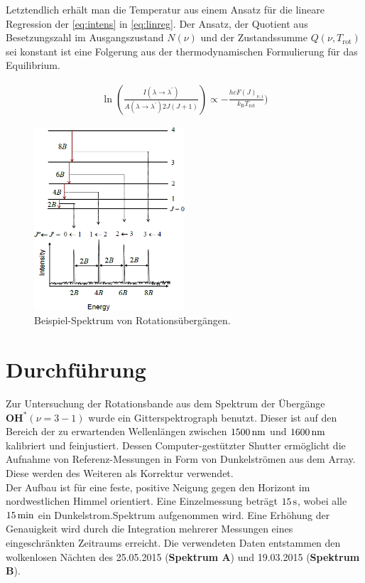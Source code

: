 \documentclass[numbers=noenddot,a4paper,notitlepage,twoside,BCOR15mm]{scrartcl}
\newcommand{\ix}[1]{_\text{#1}}
\newcommand{\fett}[1]{\textbf{#1}}
\begin{document}
		Letztendlich erhält man die Temperatur aus einem Ansatz für die lineare Regression der \autoref{eq:intens} in \autoref{eq:linreg}. Der Ansatz, der Quotient aus Besetzungszahl im Ausgangszustand $N(\nu)$ und der Zustandssumme $Q(\nu,T\ix{rot})$ sei konstant ist eine Folgerung aus der thermodynamischen Formulierung für das Equilibrium.

			\begin{align}
				\ln\left(\frac{I(\lambda\rightarrow\lambda^\prime)}{A(\lambda\rightarrow\lambda^\prime)2J(J+1)}\right)\propto-\frac{hcF(J)_{\nu,i}}{k\ix{B}T\ix{rot}}) \label{eq:linreg}
			\end{align}

			\begin{figure}[h]
				\centering
				\includegraphics[width=0.5\textwidth]{Rotational_spectrum_example.png}
				\caption{Beispiel-Spektrum von Rotationsübergängen. \cite{WikiRotat}}
				\label{img:bspspektr}
			\end{figure}

	\newpage
	\section{Durchführung}

		Zur Untersuchung der Rotationsbande aus dem Spektrum der Übergänge $\fett{OH}^\ast(\nu=3-1)$ wurde ein Gitterspektrograph benutzt. Dieser ist auf den Bereich der zu erwartenden Wellenlängen zwischen $\unit[1500]{nm}$ und $\unit[1600]{nm}$ kalibriert und feinjustiert. Dessen Computer-gestützter Shutter ermöglicht die Aufnahme von Referenz-Messungen in Form von Dunkelströmen aus dem Array. Diese werden des Weiteren als Korrektur verwendet.\\
		Der Aufbau ist für eine feste, positive Neigung gegen den Horizont im nordwestlichen Himmel orientiert. Eine Einzelmessung beträgt $\unit[15]{s}$, wobei alle $\unit[15]{min}$ ein Dunkelstrom.Spektrum aufgenommen wird. Eine Erhöhung der Genauigkeit wird durch die Integration mehrerer Messungen eines eingeschränkten Zeitraums erreicht. Die verwendeten Daten entstammen den wolkenlosen Nächten des 25.05.2015 (\fett{Spektrum A}) und 19.03.2015 (\fett{Spektrum B}).
\end{document}
